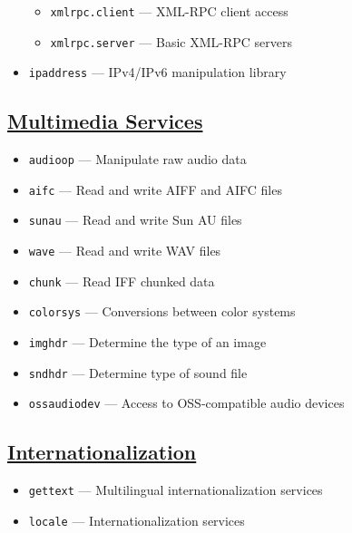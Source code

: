 \documentclass[]{book}
\providecommand{\tightlist}{%
  \setlength{\itemsep}{0pt}\setlength{\parskip}{0pt}}
\theoremstyle{definition}
\theoremstyle{definition}
\theoremstyle{definition}
\theoremstyle{remark}
\begin{document}
\begin{itemize}
  \begin{itemize}
  \tightlist
  \item
    \texttt{xmlrpc.client} --- XML-RPC client access
  \item
    \texttt{xmlrpc.server} --- Basic XML-RPC servers
  \end{itemize}
\item
  \texttt{ipaddress} --- IPv4/IPv6 manipulation library
\end{itemize}

\subsection{\texorpdfstring{\href{https://docs.python.org/3.7/library/mm.html}{Multimedia
Services}}{Multimedia Services}}\label{multimedia-services}

\begin{itemize}
\tightlist
\item
  \texttt{audioop} --- Manipulate raw audio data
\item
  \texttt{aifc} --- Read and write AIFF and AIFC files
\item
  \texttt{sunau} --- Read and write Sun AU files
\item
  \texttt{wave} --- Read and write WAV files
\item
  \texttt{chunk} --- Read IFF chunked data
\item
  \texttt{colorsys} --- Conversions between color systems
\item
  \texttt{imghdr} --- Determine the type of an image
\item
  \texttt{sndhdr} --- Determine type of sound file
\item
  \texttt{ossaudiodev} --- Access to OSS-compatible audio devices
\end{itemize}

\subsection{\texorpdfstring{\href{https://docs.python.org/3.7/library/i18n.html}{Internationalization}}{Internationalization}}\label{internationalization}

\begin{itemize}
\tightlist
\item
  \texttt{gettext} --- Multilingual internationalization services
\item
  \texttt{locale} --- Internationalization services
\end{itemize}
\end{document}
